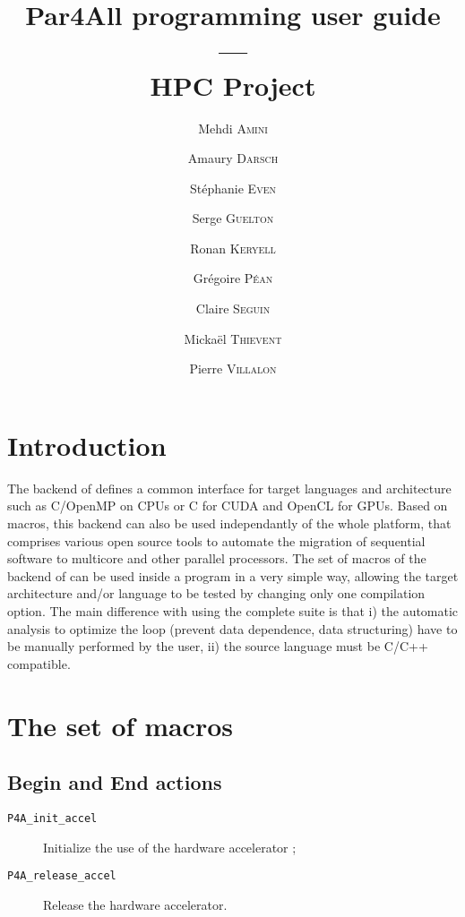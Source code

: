 \documentclass[a4paper]{article}
\begin{document}
\title{Par4All programming user guide\\
  ---\\
  HPC Project}

\author{Mehdi \textsc{Amini} \and Amaury \textsc{Darsch} \and
  Stéphanie \textsc{Even} \and Serge \textsc{Guelton} \and Ronan
  \textsc{Keryell} \and Grégoire \textsc{Péan} \and Claire
  \textsc{Seguin} \and Mickaël \textsc{Thievent} \and Pierre
  \textsc{Villalon}}

\maketitle

\tableofcontents

\section{Introduction}
\label{sec:introduction}

The backend of \Apfa defines a common interface for target languages
and architecture such as C/OpenMP on CPUs or C for CUDA and OpenCL for
GPUs. Based on macros, this backend can also be used independantly of
the whole \Apfa platform, that comprises various open source tools to
automate the migration of sequential software to multicore and other
parallel processors.  The set of macros of the backend of \Apfa can be
used inside a program in a very simple way, allowing the target
architecture and/or language to be tested by changing only one
compilation option. The main difference with using the complete \Apfa
suite is that i) the automatic analysis to optimize the loop (prevent
data dependence, data structuring) have to be manually performed by
the user, ii) the source language must be C/C++ compatible.

\section{The set of macros}
\label{sec:macros}

\subsection{Begin and End actions}

\begin{description}
\item[\texttt{P4A\_init\_accel}] Initialize the use of the hardware
  accelerator ;
\item[\texttt{P4A\_release\_accel}] Release the hardware accelerator.
\end{description}
\end{document}
